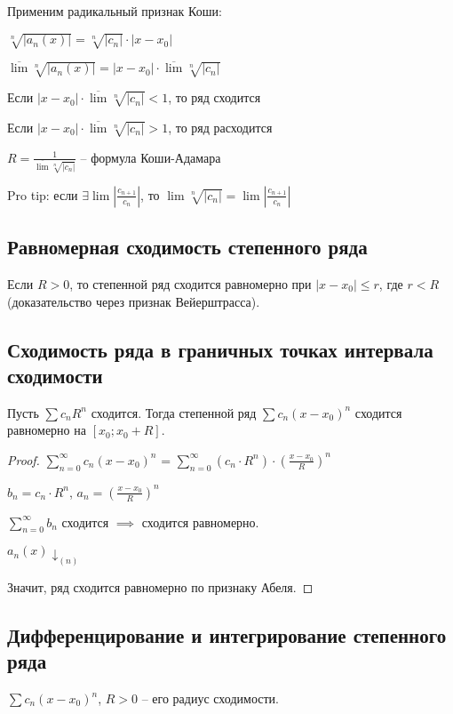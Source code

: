 Применим радикальный признак Коши:

$\sqrt[n]{|a_n(x)|} = \sqrt[n]{|c_n|} \cdot |x - x_0|$

$\overline{\lim}\sqrt[n]{|a_n(x)|} = |x - x_0| \cdot \overline{\lim}\sqrt[n]{|c_n|}$

Если $|x - x_0| \cdot \overline{\lim}\sqrt[n]{|c_n|} < 1$, то ряд сходится

Если $|x - x_0| \cdot \overline{\lim}\sqrt[n]{|c_n|} > 1$, то ряд расходится

$R = \frac{1}{\overline{\lim}\sqrt[n]{|c_n|}}$ -- формула Коши-Адамара

Pro tip: если $\exists \lim{\left|\frac{c_{n+1}}{c_n}\right|}$, то $\lim\sqrt[n]{|c_n|} = \lim\left|\frac{c_{n+1}}{c_n}\right|$

\subsection{Равномерная сходимость степенного ряда}

Если $R > 0$, то степенной ряд сходится равномерно при $|x - x_0| \leq r$, где $r < R$ (доказательство через признак Вейерштрасса).

\subsection{Сходимость ряда в граничных точках интервала сходимости}

Пусть $\sum c_n R^n$ сходится. Тогда степенной ряд $\sum c_n (x - x_0)^n$ сходится равномерно на $[x_0; x_0 + R]$.

\begin{proof}
$\sum_{n=0}^{\infty} c_n(x - x_0)^n$ =  $\sum_{n=0}^{\infty} (c_n \cdot R^n) \cdot \left(\frac{x - x_0}{R}\right)^n$

$b_n = c_n \cdot R^n$, $a_n = \left(\frac{x - x_0}{R}\right)^n$

$\sum_{n=0}^{\infty} b_n$ сходится $\implies$ сходится равномерно.

$a_n(x) \downarrow_{(n)}$

Значит, ряд сходится равномерно по признаку Абеля.
\end{proof}

\subsection{Дифференцирование и интегрирование степенного ряда}

$\sum c_n (x - x_0)^n$, $R > 0$ -- его радиус сходимости.

